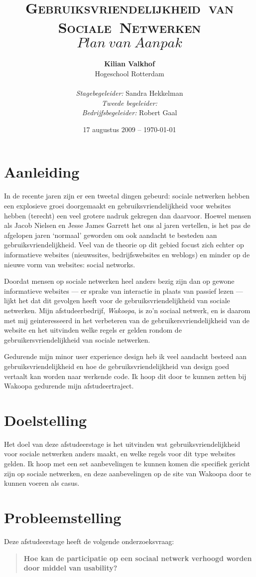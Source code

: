 \documentclass[a4paper, 10pt, pdftex]{article}
\title{\textsc{Gebruiksvriendelijkheid~van Sociale~Netwerken} \linebreak $Plan~van~Aanpak$}
\author{\textbf{Kilian Valkhof}\\
  Hogeschool Rotterdam\\
  \\
  \textit{Stagebegeleider:} Sandra Hekkelman\\
  \textit{Tweede begeleider:}\\
  \textit{Bedrijfsbegeleider:} Robert Gaal}
\date{17 augustus 2009 -- \today}
\begin{document}
  \normalem
  \maketitle

  \newpage
  \tableofcontents

  \newpage
\section{Aanleiding}
In de recente jaren zijn er een tweetal dingen gebeurd: sociale netwerken hebben een explosieve groei doorgemaakt
en gebruiksvriendelijkheid voor websites hebben (terecht) een veel grotere nadruk gekregen dan daarvoor. Hoewel mensen
als Jacob Nielsen en Jesse James Garrett het ons al jaren vertellen, is het pas de afgelopen jaren `normaal' geworden
om ook aandacht te besteden aan gebruiksvriendelijkheid. Veel van de theorie op dit gebied focust zich echter op
informatieve websites (nieuwssites, bedrijfswebsites en weblogs) en minder op de nieuwe vorm van websites: social networks.

Doordat mensen op sociale netwerken heel anders bezig zijn dan op gewone informatieve websites --- er sprake van interactie in plaats van passief lezen ---
lijkt het dat dit gevolgen heeft voor de gebruiksvriendelijkheid
van sociale netwerken. Mijn afstudeerbedrijf, \emph{Wakoopa}, is zo'n sociaal netwerk, en is daarom met mij geinteresseerd in het verbeteren
van de gebruikersvriendelijkheid van de website en het uitvinden welke regels er gelden rondom de gebruikersvriendelijkheid van sociale netwerken.

Gedurende mijn minor user experience design heb ik veel aandacht besteed aan gebruiksvriendelijkheid en hoe de gebruiksvriendelijkheid van design
goed vertaalt kan worden naar werkende code. Ik hoop dit door te kunnen zetten bij Wakoopa gedurende mijn afstudeertraject.

\section{Doelstelling}
Het doel van deze afstudeerstage is het uitvinden wat gebruiksvriendelijkheid voor sociale netwerken anders maakt, en welke regels voor dit type websites gelden.
Ik hoop met een set aanbevelingen te kunnen komen die specifiek gericht zijn op sociale netwerken, en deze aanbevelingen op de site van Wakoopa door te kunnen voeren als casus.


\section{Probleemstelling}
Deze afstudeerstage heeft de volgende onderzoeksvraag:
\begin{quotation}

 \textbf{Hoe kan de participatie op een sociaal netwerk verhoogd worden door middel van usability?}
\end{quotation}
\end{document}
